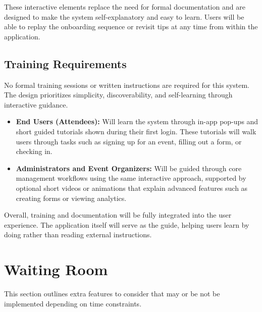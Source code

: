 \documentclass[12pt]{article}
\begin{document}
These interactive elements replace the need for formal documentation and are designed to make the system self-explanatory and easy to learn.
Users will be able to replay the onboarding sequence or revisit tips at any time from within the application.

\subsection{Training Requirements}

No formal training sessions or written instructions are required for this system.
The design prioritizes simplicity, discoverability, and self-learning through interactive guidance.

\begin{itemize}
    \item \textbf{End Users (Attendees):}
    Will learn the system through in-app pop-ups and short guided tutorials shown during their first login.
    These tutorials will walk users through tasks such as signing up for an event, filling out a form, or checking in.

    \item \textbf{Administrators and Event Organizers:}
    Will be guided through core management workflows using the same interactive approach, supported by optional short videos or animations that explain advanced features such as creating forms or viewing analytics.
\end{itemize}

Overall, training and documentation will be fully integrated into the user experience.
The application itself will serve as the guide, helping users learn by doing rather than reading external instructions.


\section{Waiting Room} \label{waitingroom}

This section outlines extra features to consider that may or be not be implemented depending on time constraints.
\end{document}
